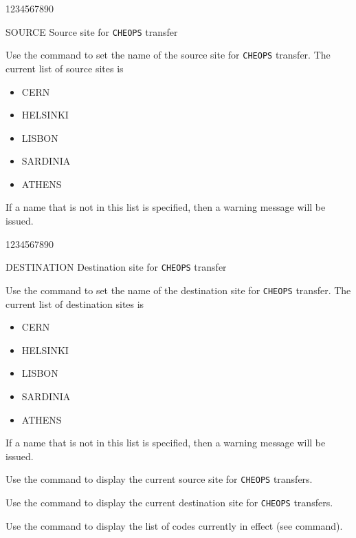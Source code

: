 \begin{DLtt}{1234567890}
\item[SOURCE]Source site for {\tt CHEOPS} transfer
\end{DLtt}
Use the  command to set the name of the
source site for {\tt CHEOPS} transfer. The current list
of source sites is

\begin{itemize}
\item CERN
\item HELSINKI
\item LISBON
\item SARDINIA
\item ATHENS
\end{itemize}

If a name that is not in this list is specified, then
a warning message will be issued.

\begin{DLtt}{1234567890}
\item[DESTINATION]Destination site for {\tt CHEOPS} transfer
\end{DLtt}
Use the  command to set the name of the
destination site for {\tt CHEOPS} transfer. The current list
of destination sites is

\begin{itemize}
\item CERN
\item HELSINKI
\item LISBON
\item SARDINIA
\item ATHENS
\end{itemize}

If a name that is not in this list is specified, then
a warning message will be issued.


Use the  command to display the current
source site for {\tt CHEOPS} transfers.


Use the  command to display the current
destination site for {\tt CHEOPS} transfers.


Use the  command to display the list of 
 codes currently in effect
(see  command).

